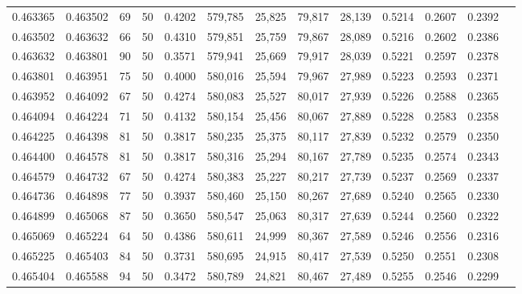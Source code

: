 \begin{tabular}{rrrrrrrrrrrrr}
0.463365 & 0.463502 &    69 &  50 &                                     0.4202 & 579,785 &  25,825 &  79,817 &  28,139 & 0.5214 & 0.2607 & 0.2392 \\
0.463502 & 0.463632 &    66 &  50 &                                     0.4310 & 579,851 &  25,759 &  79,867 &  28,089 & 0.5216 & 0.2602 & 0.2386 \\
0.463632 & 0.463801 &    90 &  50 &                                     0.3571 & 579,941 &  25,669 &  79,917 &  28,039 & 0.5221 & 0.2597 & 0.2378 \\
0.463801 & 0.463951 &    75 &  50 &                                     0.4000 & 580,016 &  25,594 &  79,967 &  27,989 & 0.5223 & 0.2593 & 0.2371 \\
0.463952 & 0.464092 &    67 &  50 &                                     0.4274 & 580,083 &  25,527 &  80,017 &  27,939 & 0.5226 & 0.2588 & 0.2365 \\
0.464094 & 0.464224 &    71 &  50 &                                     0.4132 & 580,154 &  25,456 &  80,067 &  27,889 & 0.5228 & 0.2583 & 0.2358 \\
0.464225 & 0.464398 &    81 &  50 &                                     0.3817 & 580,235 &  25,375 &  80,117 &  27,839 & 0.5232 & 0.2579 & 0.2350 \\
0.464400 & 0.464578 &    81 &  50 &                                     0.3817 & 580,316 &  25,294 &  80,167 &  27,789 & 0.5235 & 0.2574 & 0.2343 \\
0.464579 & 0.464732 &    67 &  50 &                                     0.4274 & 580,383 &  25,227 &  80,217 &  27,739 & 0.5237 & 0.2569 & 0.2337 \\
0.464736 & 0.464898 &    77 &  50 &                                     0.3937 & 580,460 &  25,150 &  80,267 &  27,689 & 0.5240 & 0.2565 & 0.2330 \\
0.464899 & 0.465068 &    87 &  50 &                                     0.3650 & 580,547 &  25,063 &  80,317 &  27,639 & 0.5244 & 0.2560 & 0.2322 \\
0.465069 & 0.465224 &    64 &  50 &                                     0.4386 & 580,611 &  24,999 &  80,367 &  27,589 & 0.5246 & 0.2556 & 0.2316 \\
0.465225 & 0.465403 &    84 &  50 &                                     0.3731 & 580,695 &  24,915 &  80,417 &  27,539 & 0.5250 & 0.2551 & 0.2308 \\
0.465404 & 0.465588 &    94 &  50 &                                     0.3472 & 580,789 &  24,821 &  80,467 &  27,489 & 0.5255 & 0.2546 & 0.2299 \\

\end{tabular}
